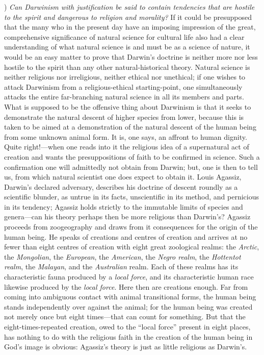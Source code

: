 \documentclass[12pt,a4paper]{article}
\begin{document}
\medskip

) \emph{Can Darwinism with justification be said to contain
tendencies that are hostile to the spirit and dangerous to religion
and morality?} If it could be presupposed that the many who in the
present day have an imposing impression of the great, comprehensive
significance of natural science for cultural life also had a clear
understanding of what natural science is and must be as a science of
nature, it would be an easy matter to prove that Darwin's doctrine is
neither more nor less hostile to the spirit than any other
natural-historical theory.
Natural science is neither religious nor irreligious, neither ethical
nor unethical; if one wishes to attack Darwinism from a
religious-ethical starting-point, one simultaneously attacks the
entire far-branching natural science in all its members and parts.
What is supposed to be the offensive thing about Darwinism is that it
seeks to demonstrate the natural descent of higher species from lower,
because this is taken to be aimed at a demonstration of the natural
descent of the human being from some unknown animal form. It is, one
says, an affront to human dignity. Quite right!---when one reads into
it the religious idea of a supernatural act of creation and wants the
presuppositions of faith to be confirmed in science. Such a
confirmation one will admittedly not obtain from Darwin; but, one is
then to tell us, from which natural scientist one does expect to
obtain it.
Louis Agassiz, Darwin's declared adversary, describes his doctrine of
descent roundly as a scientific blunder, as untrue in its facts,
unscientific in its method, and pernicious in its tendency; Agassiz
holds strictly to the immutable limits of species and genera---can his
theory perhaps then be more religious than Darwin's? Agassiz proceeds
from zoogeography and draws from it consequences for the origin of the
human being. He speaks of creations and centres of creation and arrives
at no fewer than eight centres of creation with eight great zoological
realms: the \emph{Arctic}, the \emph{Mongolian}, the \emph{European}, the \emph{American}, the
\emph{Negro realm}, the \emph{Hottentot realm}, the \emph{Malayan}, and the \emph{Australian}
realm. Each of these realms has its characteristic fauna produced by a
\emph{local force}, and its characteristic human race likewise produced by
the \emph{local force}. Here then are creations enough. Far from coming into
ambiguous contact with animal transitional forms, the human being
stands independently over against the animal; for the human being was
created not merely once but eight times---that can count for something.
But that the eight-times-repeated creation, owed to the ``local
force'' present in eight places, has nothing to do with the religious
faith in the creation of the human being in God's image is obvious:
Agassiz's theory is just as little religious as Darwin's.
\end{document}

